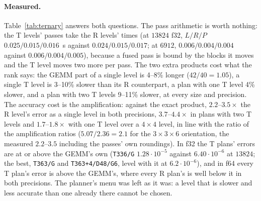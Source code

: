 \documentclass[11pt]{article}
\newcommand{\lv}[1]{\texttt{#1}}
\begin{document}
\paragraph{Measured.}
Table~\ref{tab:ternary} answers both questions.  The pass arithmetic is worth
nothing: the T levels' passes take the R levels' times (at $13824$ f32,
$L/R/P$ $0.025/0.015/0.016$~s against $0.024/0.015/0.017$; at $6912$,
$0.006/0.004/0.004$ against $0.006/0.004/0.005$), because a fused pass is bound by the blocks it
moves and the T level moves two more per pass.  The two extra products cost
what the rank says: the GEMM part of a single level is 4--8\% longer
($42/40=1.05$), a single T level is 3--10\% slower than its R counterpart, a
plan with one T level 4\% slower, and a plan with two T levels 9--11\%
slower, at every size and precision.  The accuracy cost is the
amplification: against the exact product, $2.2$--$3.5\times$ the R level's
error as a single level in both precisions, $3.7$--$4.4\times$ in plans with
two T levels and $1.7$--$1.8\times$ with one T level over a $4\times4$ level,
in line with the ratio of the amplification ratios
($5.07/2.36 = 2.1$ for the $3\times3\times6$ orientation, the measured
$2.2$--$3.5$ including the passes' own roundings).  In f32 the T plans'
errors are at or above the GEMM's own (\lv{T336/G} $1.28\cdot10^{-5}$ against
$6.40\cdot10^{-6}$ at $13824$; the best, \lv{T363/G} and \lv{T363+4/D48/G6},
level with it at $6.2\cdot10^{-6}$), and in f64 every T plan's error is
above the GEMM's, where every R plan's is well below it in both precisions.
The planner's menu was left as it was: a level that is slower and less
accurate than one already there cannot be chosen.
\end{document}
